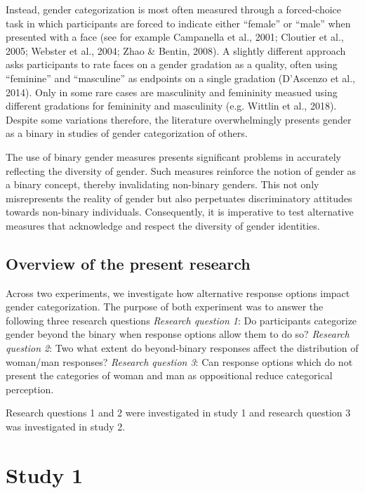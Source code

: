 \documentclass[
  man]{apa7}
\begin{document}
Instead, gender categorization is most often measured through a forced-choice task in which participants are forced to indicate either ``female'' or ``male'' when presented with a face (see for example Campanella et al., 2001; Cloutier et al., 2005; Webster et al., 2004; Zhao \& Bentin, 2008). A slightly different approach asks participants to rate faces on a gender gradation as a quality, often using ``feminine'' and ``masculine'' as endpoints on a single gradation (D'Ascenzo et al., 2014). Only in some rare cases are masculinity and femininity measued using different gradations for femininity and masculinity (e.g. Wittlin et al., 2018). Despite some variations therefore, the literature overwhelmingly presents gender as a binary in studies of gender categorization of others.

The use of binary gender measures presents significant problems in accurately reflecting the diversity of gender. Such measures reinforce the notion of gender as a binary concept, thereby invalidating non-binary genders. This not only misrepresents the reality of gender but also perpetuates discriminatory attitudes towards non-binary individuals. Consequently, it is imperative to test alternative measures that acknowledge and respect the diversity of gender identities.

\hypertarget{overview-of-the-present-research}{%
\subsection{Overview of the present research}\label{overview-of-the-present-research}}

Across two experiments, we investigate how alternative response options impact gender categorization. The purpose of both experiment was to answer the following three research questions
\emph{Research question 1}: Do participants categorize gender beyond the binary when response options allow them to do so?
\emph{Research question 2}: Two what extent do beyond-binary responses affect the distribution of woman/man responses?
\emph{Research question 3}: Can response options which do not present the categories of woman and man as oppositional reduce categorical perception.

Research questions 1 and 2 were investigated in study 1 and research question 3 was investigated in study 2.

\hypertarget{study-1}{%
\section{Study 1}\label{study-1}}
\end{document}

